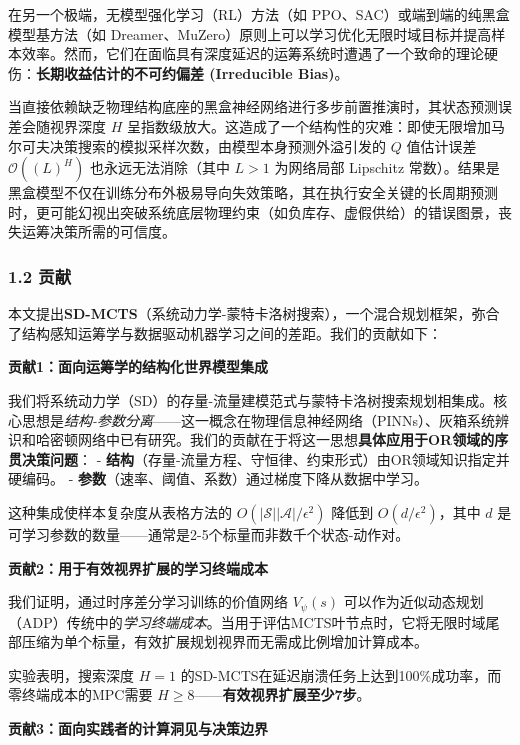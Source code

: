 \documentclass[UTF8]{ctexart}
\begin{document}
在另一个极端，无模型强化学习（RL）方法（如
PPO、SAC）或端到端的纯黑盒模型基方法（如
Dreamer、MuZero）原则上可以学习优化无限时域目标并提高样本效率。然而，它们在面临具有深度延迟的运筹系统时遭遇了一个致命的理论硬伤：\textbf{长期收益估计的不可约偏差
(Irreducible Bias)}。

当直接依赖缺乏物理结构底座的黑盒神经网络进行多步前置推演时，其状态预测误差会随视界深度
\(H\)
呈指数级放大。这造成了一个结构性的灾难：即使无限增加马尔可夫决策搜索的模拟采样次数，由模型本身预测外溢引发的
\(Q\) 值估计误差 \(\mathcal{O}((L)^H)\) 也永远无法消除（其中 \(L>1\)
为网络局部 Lipschitz
常数）。结果是黑盒模型不仅在训练分布外极易导向失效策略，其在执行安全关键的长周期预测时，更可能幻视出突破系统底层物理约束（如负库存、虚假供给）的错误图景，丧失运筹决策所需的可信度。

\hypertarget{ux8d21ux732e}{%
\subsubsection{1.2 贡献}\label{ux8d21ux732e}}

本文提出\textbf{SD-MCTS}（系统动力学-蒙特卡洛树搜索），一个混合规划框架，弥合了结构感知运筹学与数据驱动机器学习之间的差距。我们的贡献如下：

\textbf{贡献1：面向运筹学的结构化世界模型集成}

我们将系统动力学（SD）的存量-流量建模范式与蒙特卡洛树搜索规划相集成。核心思想是\emph{结构-参数分离}------这一概念在物理信息神经网络（PINNs）、灰箱系统辨识和哈密顿网络中已有研究。我们的贡献在于将这一思想\textbf{具体应用于OR领域的序贯决策问题}：
-
\textbf{结构}（存量-流量方程、守恒律、约束形式）由OR领域知识指定并硬编码。
- \textbf{参数}（速率、阈值、系数）通过梯度下降从数据中学习。

这种集成使样本复杂度从表格方法的
\(O(|\mathcal{S}||\mathcal{A}|/\epsilon^2)\) 降低到
\(O(d/\epsilon^2)\)，其中 \(d\)
是可学习参数的数量------通常是2-5个标量而非数千个状态-动作对。

\textbf{贡献2：用于有效视界扩展的学习终端成本}

我们证明，通过时序差分学习训练的价值网络 \(V_\psi(s)\)
可以作为近似动态规划（ADP）传统中的\emph{学习终端成本}。当用于评估MCTS叶节点时，它将无限时域尾部压缩为单个标量，有效扩展规划视界而无需成比例增加计算成本。

实验表明，搜索深度 \(H=1\)
的SD-MCTS在延迟崩溃任务上达到100\%成功率，而零终端成本的MPC需要
\(H \geq 8\)------\textbf{有效视界扩展至少7步}。

\textbf{贡献3：面向实践者的计算洞见与决策边界}
\end{document}
